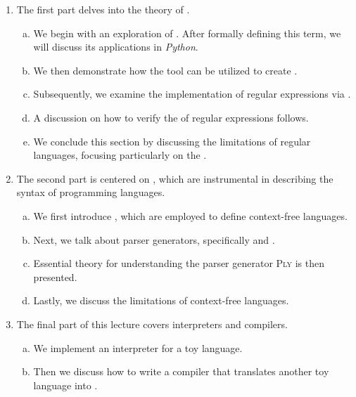 \begin{enumerate}
\item The first part delves into the theory of .
  \begin{enumerate}[(a)]
  \item We begin with an exploration of . After formally defining this term, we will discuss its applications in \textsl{Python}.
  \item We then demonstrate how the  tool can be utilized to create .
  \item Subsequently, we examine the implementation of regular expressions via .
  \item A discussion on how to verify the  of regular expressions follows.
  \item We conclude this section by discussing the limitations of regular languages, focusing particularly on the .
  \end{enumerate}
  
\item The second part is centered on , which are instrumental in describing the syntax of programming languages.
  \begin{enumerate}[(a)]
  \item We first introduce , which are employed to define context-free languages.
  \item Next, we talk about parser generators, specifically  and .
  \item Essential theory for understanding the parser generator \textsc{Ply} is then presented.
  \item Lastly, we discuss the limitations of context-free languages.
  \end{enumerate}

\item The final part of this lecture covers interpreters and compilers.
  \begin{enumerate}[(a)]
  \item We implement an interpreter for a toy language.
  \item Then we discuss how to write a compiler that translates another toy language into .
  \end{enumerate}
\end{enumerate}

